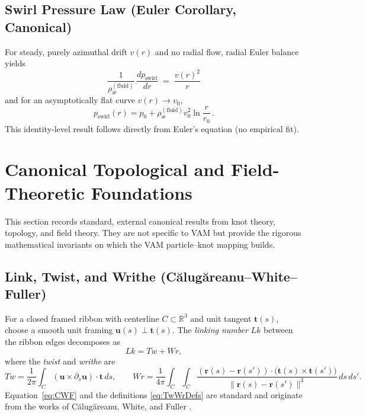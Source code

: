 \documentclass[11pt, a4paper]{article}
\begin{document}
\subsection{Swirl Pressure Law (Euler Corollary, Canonical)}
\label{subsec:canon-darkpressure}
For steady, purely azimuthal drift $v(r)$ and no radial flow, radial Euler balance yields
\[
    \boxed{\, \frac{1}{\rho_{\text{\ae}}^{(\text{fluid})}}\,\frac{dp_{\text{swirl}}}{dr} \;=\; \frac{v(r)^2}{r} \,}
\]
and for an asymptotically flat curve $v(r)\to v_0$,
\[
    p_{\text{swirl}}(r) = p_0 + \rho_{\text{\ae}}^{(\text{fluid})} v_0^2 \ln\!\frac{r}{r_0}\,.
\]
This identity-level result follows directly from Euler’s equation (no empirical fit). \cite{Batchelor1967,LandauLifshitz1987}


\appendix

\section{Canonical Topological and Field-Theoretic Foundations}
\label{sec:topofields}

This section records standard, external canonical results from knot theory, topology, and field theory. They are not specific to VAM but provide the rigorous mathematical invariants on which the VAM particle–knot mapping builds.

\subsection{Link, Twist, and Writhe (Călugăreanu--White--Fuller)}
For a closed framed ribbon with centerline \(C\subset\mathbb{R}^3\) and unit tangent \(\mathbf t(s)\), choose a smooth unit framing \(\mathbf u(s)\perp \mathbf t(s)\).
The \emph{linking number} \(Lk\) between the ribbon edges decomposes as
\begin{equation}
    Lk = Tw + Wr, \label{eq:CWF}
\end{equation}
where the \emph{twist} and \emph{writhe} are
\begin{equation}
    Tw = \frac{1}{2\pi}\int_C (\mathbf u \times \partial_s \mathbf u)\cdot \mathbf t \, ds, \qquad
    Wr = \frac{1}{4\pi}\int_C\!\!\int_C
    \frac{(\mathbf r(s)-\mathbf r(s'))\cdot\big(\mathbf t(s)\times \mathbf t(s')\big)}
    {\lVert \mathbf r(s)-\mathbf r(s')\rVert^3}\, ds\,ds'. \label{eq:TwWrDefs}
\end{equation}
Equation~\eqref{eq:CWF} and the definitions \eqref{eq:TwWrDefs} are standard and originate from the works of Călugăreanu, White, and Fuller \cite{Calugareanu1959,White1969,Fuller1971}.
\end{document}
